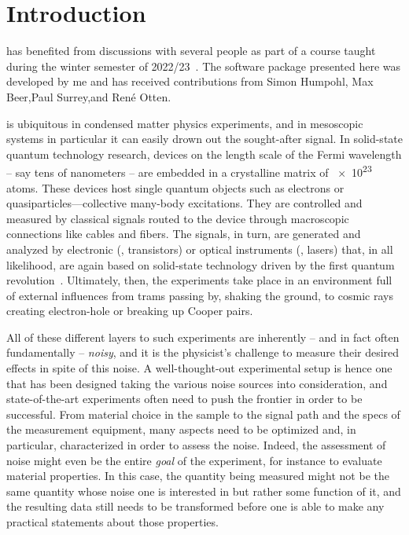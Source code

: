 \chapter{Introduction}\label{ch:speck:introduction}

\begin{partcontribs}
    \Thispart has benefited from discussions with several people as part of a course taught during the winter semester of 2022/23~.
    The software package presented here was developed by me and has received contributions from Simon Humpohl,\sidenote[a]{\RWTHFZJ}
    Max Beer,\sidenotemark[a] Paul Surrey,\sidenotemark[a] and René Otten.
\end{partcontribs}

 is ubiquitous in condensed matter physics experiments, and in mesoscopic systems in particular it can easily drown out the sought-after signal.
In solid-state quantum technology research, devices on the length scale of the Fermi wavelength -- say tens of nanometers -- are embedded in a crystalline matrix of \num{e23} atoms.
These devices host single quantum objects such as electrons or quasiparticles---collective many-body excitations.
They are controlled and measured by classical signals routed to the device through macroscopic connections like cables and fibers.
The signals, in turn, are generated and analyzed by electronic (\eg, transistors) or optical instruments (\eg, lasers) that, in all likelihood, are again based on solid-state technology driven by the first quantum revolution~\cite{Dowling2003,Aspect2024}.
Ultimately, then, the experiments take place in an environment full of external influences from trams passing by, shaking the ground, to cosmic rays creating electron-hole or breaking up Cooper pairs.

All of these different layers to such experiments are inherently -- and in fact often fundamentally
-- \emph{noisy}, and it is the physicist's challenge to measure their desired effects in spite of this noise.
A well-thought-out experimental setup is hence one that has been designed taking the various noise sources into consideration, and state-of-the-art experiments often need to push the frontier in order to be successful.
From material choice in the sample to the signal path and the specs of the measurement equipment, many aspects need to be optimized and, in particular, characterized in order to assess the noise.
Indeed, the assessment of noise might even be the entire \emph{goal} of the experiment, for instance to evaluate material properties.
In this case, the quantity being measured might not be the same quantity whose noise one is interested in but rather some function of it, and the resulting data still needs to be transformed before one is able to make any practical statements about those properties.

